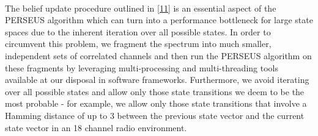 \documentclass[10pt,twocolumn]{IEEEtran}
\begin{document}
\\The belief update procedure outlined in \eqref{11} is an essential aspect of the PERSEUS algorithm which can turn into a performance bottleneck for large state spaces due to the inherent iteration over all possible states. In order to circumvent this problem, we fragment the spectrum into much smaller, independent sets of correlated channels and then run the PERSEUS algorithm on these fragments by leveraging multi-processing and multi-threading tools available at our disposal in software frameworks. Furthermore, we avoid iterating over all possible states and allow only those state transitions we deem to be the most probable - for example, we allow only those state transitions that involve a Hamming distance of up to 3 between the previous state vector and the current state vector in an 18 channel radio environment.

 
\end{document}
